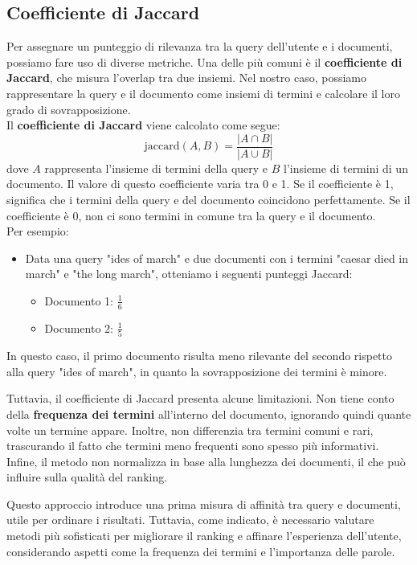 \documentclass{report}
\begin{document}
	\subsection{Coefficiente di Jaccard}
	Per assegnare un punteggio di rilevanza tra la query dell'utente e i documenti, possiamo fare uso di diverse metriche. Una delle più comuni è il \textbf{coefficiente di Jaccard}, che misura l'overlap tra due insiemi. Nel nostro caso, possiamo rappresentare la query e il documento come insiemi di termini e calcolare il loro grado di sovrapposizione.\\
	Il \textbf{coefficiente di Jaccard} viene calcolato come segue:
	\[
	\text{jaccard}(A, B) = \frac{|A \cap B|}{|A \cup B|}
	\]
	dove \( A \) rappresenta l'insieme di termini della query e \( B \) l'insieme di termini di un documento. Il valore di questo coefficiente varia tra 0 e 1. Se il coefficiente è 1, significa che i termini della query e del documento coincidono perfettamente. Se il coefficiente è 0, non ci sono termini in comune tra la query e il documento.
	\vspace{\baselineskip}\\
	Per esempio:
	\begin{itemize}
		\item Data una query "ides of march" e due documenti con i termini "caesar died in march" e "the long march", otteniamo i seguenti punteggi Jaccard:
		\begin{itemize}
			\item Documento 1: \( \frac{1}{6} \)
			\item Documento 2: \( \frac{1}{5} \)
		\end{itemize}
	\end{itemize}
	In questo caso, il primo documento risulta meno rilevante del secondo rispetto alla query "ides of march", in quanto la sovrapposizione dei termini è minore.

	Tuttavia, il coefficiente di Jaccard presenta alcune limitazioni. Non tiene conto della \textbf{frequenza dei termini} all'interno del documento, ignorando quindi quante volte un termine appare. Inoltre, non differenzia tra termini comuni e rari, trascurando il fatto che termini meno frequenti sono spesso più informativi. Infine, il metodo non normalizza in base alla lunghezza dei documenti, il che può influire sulla qualità del ranking.

	Questo approccio introduce una prima misura di affinità tra query e documenti, utile per ordinare i risultati. Tuttavia, come indicato, è necessario valutare metodi più sofisticati per migliorare il ranking e affinare l'esperienza dell'utente, considerando aspetti come la frequenza dei termini e l’importanza delle parole.
\end{document}
